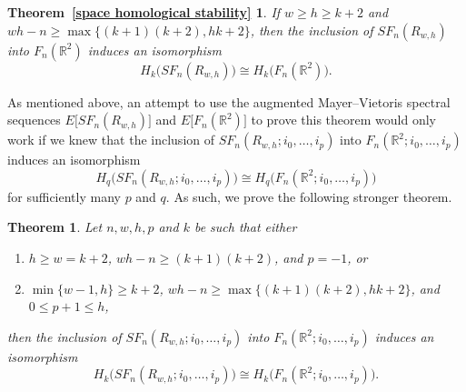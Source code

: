 \documentclass[pagebackref,colorlinks,citecolor=blue,linkcolor=blue,urlcolor=blue,filecolor=blue]{article}
\newtheorem*{T1}{Theorem~\ref{space homological stability}}
\newtheorem{thm}{Theorem}[section]
\theoremstyle{definition}\newtheorem{definition}[thm]{Definition}
\theoremstyle{definition}
\newcommand{\thmtext}{
If $w\ge h\ge k+2$ and $wh-n\ge \max\big\{(k+1)(k+2), hk+2\big\}$, then the inclusion of $SF_{n}(R_{w,h})$ into $F_{n}(\R^{2})$
induces an isomorphism
\[
H_{k}\big(SF_{n}(R_{w,h})\big)\cong H_{k}\big(F_{n}(\R^{2})\big).
\]
}
\newcommand{\R}{\ensuremath{\mathbb{R}}}
\begin{document}
\begin{T1}
  \thmtext
\end{T1}

As mentioned above, an attempt to use the augmented Mayer--Vietoris spectral sequences $E\big[SF_{n}(R_{w,h})\big]$ and $E\big[F_{n}(\R^{2})\big]$ to prove this theorem would only work if we knew that the inclusion of $SF_{n}(R_{w, h}; i_{0}, \dots, i_{p})$ into $F_{n}(\R^{2}; i_{0}, \dots, i_{p})$ induces an isomorphism
\[
H_{q}\big(SF_{n}(R_{w, h}; i_{0}, \dots, i_{p})\big)\cong H_{q}\big(F_{n}(\R^{2}; i_{0}, \dots, i_{p})\big)
\]
for sufficiently many $p$ and $q$.
As such, we prove the following stronger theorem.

\begin{thm}\label{generalized main theorem}
Let $n,w,h, p$ and $k$ be such that either
\begin{enumerate}
    \item $h\ge w=k+2$, $wh-n\ge (k+1)(k+2)$, and  $p=-1$, or
    \item $\min\{w-1,h\}\ge k+2$, $wh-n\ge \max\big\{(k+1)(k+2), hk+2\big\}$, and $0\le p+1\le h$, 
\end{enumerate}
then the inclusion of $SF_{n}(R_{w,h};i_{0},\dots, i_{p})$ into $F_{n}(\R^{2}; i_{0}, \dots, i_{p})$ induces an isomorphism
\[
H_{k}\big(SF_{n}(R_{w,h};i_{0},\dots, i_{p})\big)\cong H_{k}\big(F_{n}(\R^{2}; i_{0}, \dots, i_{p})\big).
\]
\end{thm}
\end{document}
